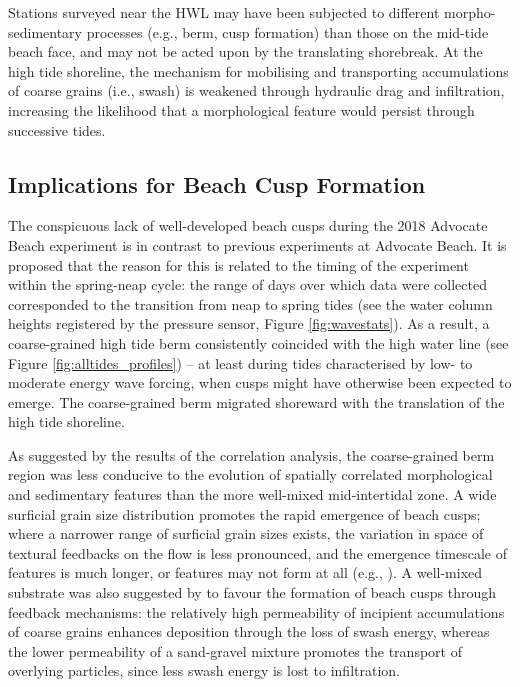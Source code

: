 \documentclass[jmse,article,submit,pdftex,moreauthors]{Definitions/mdpi}
\begin{document}
Stations surveyed near the HWL may have been subjected to different morpho-sedimentary processes (e.g., berm, cusp formation) than those on the mid-tide beach face, and may not be acted upon by the translating shorebreak. At the high tide shoreline, the mechanism for mobilising and transporting accumulations of coarse grains (i.e., swash) is weakened through hydraulic drag and infiltration, increasing the likelihood that a morphological feature would persist through successive tides.


\subsection{Implications for Beach Cusp Formation}\label{Discussion:Cusps}

The conspicuous lack of well-developed beach cusps during the 2018 Advocate Beach experiment is in contrast to previous experiments at Advocate Beach. It is proposed that the reason for this is related to the timing of the experiment within the spring-neap cycle: the range of days over which data were collected corresponded to the transition from neap to spring tides (see the water column heights registered by the pressure sensor, Figure \ref{fig:wavestats}). As a result, a coarse-grained high tide berm consistently coincided with the high water line (see Figure \ref{fig:alltides_profiles}) -- at least during tides characterised by low- to moderate energy wave forcing, when cusps might have otherwise been expected to emerge. The coarse-grained berm migrated shoreward with the translation of the high tide shoreline.

As suggested by the results of the correlation analysis, the coarse-grained berm region was less conducive to the evolution of spatially correlated morphological and sedimentary features than the more well-mixed mid-intertidal zone. A wide surficial grain size distribution promotes the rapid emergence of beach cusps; where a narrower range of surficial grain sizes exists, the variation in space of textural feedbacks on the flow is less pronounced, and the emergence timescale of features is much longer, or features may not form at all (e.g., \citep{Guest_Hay2019}). A well-mixed substrate was also suggested by \citet{LonguetHiggins_Parkin1962} to favour the formation of beach cusps through feedback mechanisms: the relatively high permeability of incipient accumulations of coarse grains enhances deposition through the loss of swash energy, whereas the lower permeability of a sand-gravel mixture promotes the transport of overlying particles, since less swash energy is lost to infiltration. 
\end{document}
